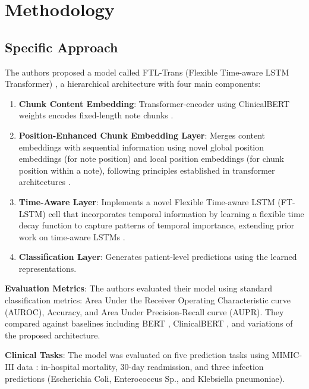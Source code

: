 \documentclass[10pt,letterpaper,twocolumn]{article}
\begin{document}
\section{Methodology}

\subsection{Specific Approach}

The authors proposed a model called FTL-Trans (Flexible Time-aware LSTM Transformer) \cite{zhang2020time}, a hierarchical architecture with four main components:

\begin{enumerate}[leftmargin=*]
\item \textbf{Chunk Content Embedding}: Transformer-encoder using ClinicalBERT weights encodes fixed-length note chunks \cite{huang2019clinicalbert}.
    
    \item \textbf{Position-Enhanced Chunk Embedding Layer}: Merges content embeddings with sequential information using novel global position embeddings (for note position) and local position embeddings (for chunk position within a note), following principles established in transformer architectures \cite{vaswani2017attention}.
    
    \item \textbf{Time-Aware Layer}: Implements a novel Flexible Time-aware LSTM (FT-LSTM) cell that incorporates temporal information by learning a flexible time decay function to capture patterns of temporal importance, extending prior work on time-aware LSTMs \cite{baytas2017patient}.
    
    \item \textbf{Classification Layer}: Generates patient-level predictions using the learned representations.
\end{enumerate}

\textbf{Evaluation Metrics}: The authors evaluated their model using standard classification metrics: Area Under the Receiver Operating Characteristic curve (AUROC), Accuracy, and Area Under Precision-Recall curve (AUPR). They compared against baselines including BERT \cite{devlin2018bert}, ClinicalBERT \cite{huang2019clinicalbert}, and variations of the proposed architecture.

\textbf{Clinical Tasks}: The model was evaluated on five prediction tasks using MIMIC-III data \cite{johnson2016mimic}: in-hospital mortality, 30-day readmission, and three infection predictions (Escherichia Coli, Enterococcus Sp., and Klebsiella pneumoniae).
\end{document}
